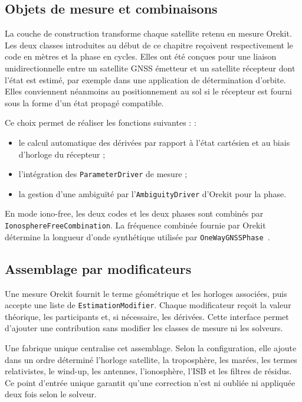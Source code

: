 \subsection{Objets de mesure et combinaisons}

La couche de construction transforme chaque satellite retenu en mesure
Orekit. Les deux classes introduites au début de ce chapitre reçoivent
respectivement le code en mètres et la phase en cycles. Elles ont été conçues
pour une liaison unidirectionnelle entre un satellite GNSS émetteur et un
satellite récepteur dont l'état est estimé, par exemple dans une application
de détermination d'orbite. Elles conviennent néanmoins au positionnement au
sol si le récepteur est fourni sous la forme d'un état propagé compatible.

Ce choix permet de réaliser les fonctions suivantes : :

\begin{itemize}
    \item le calcul automatique des dérivées par rapport à l'état cartésien et
    au biais d'horloge du récepteur ;
    \item l'intégration des \texttt{ParameterDriver} de mesure ;
    \item la gestion d'une ambiguïté par l'\texttt{AmbiguityDriver} d'Orekit pour
    la phase.
\end{itemize}

En mode iono-free, les deux codes et les deux phases sont combinés par
\texttt{IonosphereFreeCombination}. La fréquence combinée fournie par Orekit
détermine la longueur d'onde synthétique utilisée par
\texttt{OneWayGNSSPhase}~\cite{orekit131api}.

\subsection{Assemblage par modificateurs}

Une mesure Orekit fournit le terme géométrique et les horloges associées, puis
accepte une liste de \texttt{EstimationModifier}. Chaque modificateur reçoit
la valeur théorique, les participants et, si nécessaire, les dérivées. Cette
interface permet d'ajouter une contribution sans modifier les classes de
mesure ni les solveurs.

Une fabrique unique centralise cet assemblage. Selon la configuration, elle
ajoute dans un ordre déterminé l'horloge satellite, la troposphère, les
marées, les termes relativistes, le wind-up, les antennes, l'ionosphère, l'ISB
et les filtres de résidus. Ce point d'entrée unique garantit qu'une correction
n'est ni oubliée ni appliquée deux fois selon le solveur.

